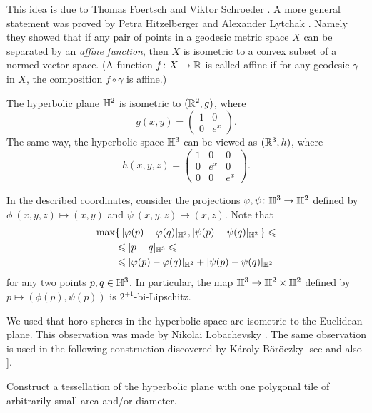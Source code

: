 This idea is due to Thomas Foertsch
and Viktor Schroeder \cite{foertsch-schroeder}.
A more general statement was proved by Petra Hitzelberger and Alexander Lytchak \cite{hitzelberger-lytchak}.
Namely they showed that 
if any pair of points in a geodesic metric space $X$ can be separated by an \emph{affine function},
then $X$ is isometric to a convex subset of a normed vector space.
(A function $f\colon X\to\mathbb{R}$ is called affine if for any geodesic $\gamma$ in $X$, the composition $f\circ\gamma$ is affine.)


The hyperbolic plane $\mathbb{H}^2$ is isometric to $(\mathbb{R}^2,g)$, where 
\[g(x,y)=\left(\begin{matrix}
     1&0
     \\
     0&e^{x}
    \end{matrix}\right).\]
The same way, the hyperbolic space $\mathbb{H}^3$
can be viewed as $(\mathbb{R}^3,h)$, where 
\[h(x,y,z)=\left(\begin{matrix}
     1&0&0
     \\
     0&e^{x}&0
     \\
     0&0&e^{x}
\end{matrix}\right).\]
    
In the described coordinates, consider the projections $\varphi,\psi\colon\mathbb{H}^3\to\mathbb{H}^2$ defined by 
$\phi\:(x,y,z)\mapsto (x,y)$ and $\psi\:(x,y,z)\mapsto (x,z)$.
Note that 
\begin{align*}
\max&\{\,|\varphi(p)-\varphi(q)|_{\mathbb{H}^2},|\psi(p)-\psi(q)|_{\mathbb{H}^2}\,\}
\leqslant
\\
&\leqslant
|p-q|_{\mathbb{H}^3}
\leqslant
\\
&\leqslant
|\varphi(p)-\varphi(q)|_{\mathbb{H}^2}+ |\psi(p)-\psi(q)|_{\mathbb{H}^2}
\end{align*}
for any two points $p,q\in \mathbb{H}^3$.
In particular, the map $\mathbb{H}^3\to\mathbb{H}^2\times\mathbb{H}^2$ defined by $p\mapsto (\phi(p),\psi(p))$
is $2^{\mp1}$-bi-Lipschitz.\qeds

We used that horo-spheres in the hyperbolic space are isometric to the Euclidean plane.
This observation was made by Nikolai Lobachevsky \cite[see 34 in][]{lobachevsky}.
The same observation is used in the following construction discovered by 
K\'{a}roly B\"{o}r\"{o}czky [see  and also ]. 

\begin{pr}
Construct a tessellation of the hyperbolic plane with one polygonal tile of arbitrarily small area and/or diameter.  
\end{pr}

